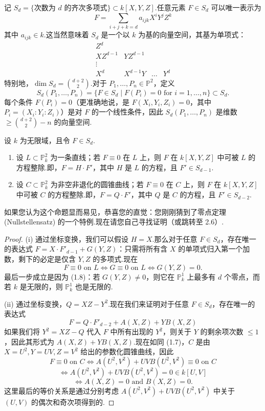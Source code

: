 记 \(S_d = \{\text{次数为 } d \text{ 的齐次多项式}\} \subset k[X, Y, Z]\).任意元素 \(F \in S_d\) 可以唯一表示为
\[
F = \sum_{i+j+k=d} a_{ijk} X^i Y^j Z^k
\]
其中 \(a_{ijk} \in k\).这当然意味着 \(S_d\) 是一个以 \(k\) 为基的向量空间，其基为单项式：
\[
\begin{array}{cccc}
Z^d & & & \\
XZ^{d-1} & YZ^{d-1} & & \\
\vdots & & & \\
X^d & X^{d-1}Y & \dots & Y^d
\end{array}
\]
特别地，\(\dim S_d = \binom{d+2}{2}\).对于 \(P_1, \dots, P_n \in \mathbb{P}^2\)，定义
\[
S_d(P_1, \dots, P_n) = \{ F \in S_d \mid F(P_i) = 0 \text{ for } i=1, \dots, n \} \subset S_d.
\]
每个条件 \(F(P_i) = 0\)（更准确地说，是 \(F(X_i, Y_i, Z_i) = 0\)，其中 \(P_i = (X_i:Y_i:Z_i)\)）是对 \(F\) 的一个线性条件，因此 \(S_d(P_1, \dots, P_n)\) 是维数 \(\geq \binom{d+2}{2} - n\) 的向量空间.

\begin{lemma}
设 \(k\) 为无限域，且令 \(F \in S_d\).
\begin{enumerate}
    \item[(i)] 设 \(L \subset \mathbb{P}^2_k\) 为一条直线；若 \(F \equiv 0\) 在 \(L\) 上，则 \(F\) 在 \(k[X,Y,Z]\) 中可被 \(L\) 的方程整除.即，\(F = H \cdot F'\)，其中 \(H\) 是 \(L\) 的方程，且 \(F' \in S_{d-1}\).
    \item[(ii)] 设 \(C \subset \mathbb{P}^2_k\) 为非空非退化的圆锥曲线；若 \(F \equiv 0\) 在 \(C\) 上，则 \(F\) 在 \(k[X,Y,Z]\) 中可被 \(C\) 的方程整除.即，\(F = Q \cdot F'\)，其中 \(Q\) 是 \(C\) 的方程，且 \(F' \in S_{d-2}\).
\end{enumerate}
\end{lemma}

如果您认为这个命题显而易见，恭喜您的直觉：您刚刚猜到了零点定理 (Nullstellensatz) 的一个特例.现在请您自己寻找证明（或跳转至 2.6）.

\begin{proof}
(i) 通过坐标变换，我们可以假设 \(H = X\).那么对于任意 \(F \in S_d\)，存在唯一的表达式 \(F = X \cdot F'_{d-1} + G(Y, Z)\)：只需将所有含 \(X\) 的单项式归入第一个加数，剩下的必定是仅含 \(Y, Z\) 的多项式.现在
\[
F \equiv 0 \text{ on } L \iff G \equiv 0 \text{ on } L \iff G(Y, Z) = 0.
\]
最后一步成立是因为 (1.8)：若 \(G(Y, Z) \neq 0\)，则它在 \(\mathbb{P}^1_k\) 上最多有 \(d\) 个零点，而若 \(k\) 是无限的，则 \(\mathbb{P}^1_k\) 也是无限的.

(ii) 通过坐标变换，\(Q = XZ - Y^2\).现在我们来证明对于任意 \(F \in S_d\)，存在唯一的表达式
\[
F = Q \cdot F'_{d-2} + A(X, Z) + YB(X, Z)
\]
如果我们将 \(Y^2 = XZ - Q\) 代入 \(F\) 中所有出现的 \(Y^2\)，则关于 \(Y\) 的剩余项次数 \(\leq 1\)，因此其形式为 \(A(X, Z) + YB(X, Z)\).现在如同 (1.7)，\(C\) 是由 \(X=U^2, Y=UV, Z=V^2\) 给出的参数化圆锥曲线，因此
\[
F \equiv 0 \text{ on } C \iff A(U^2, V^2) + UVB(U^2, V^2) \equiv 0 \text{ on } C
\]
\[
\iff A(U^2, V^2) + UVB(U^2, V^2) = 0 \in k[U, V]
\]
\[
\iff A(X, Z) = 0 \text{ and } B(X, Z) = 0.
\]
这里最后的等价关系是通过分别考虑 \(A(U^2, V^2) + UVB(U^2, V^2)\) 中关于 \((U,V)\) 的偶次和奇次项得到的.
\end{proof}

